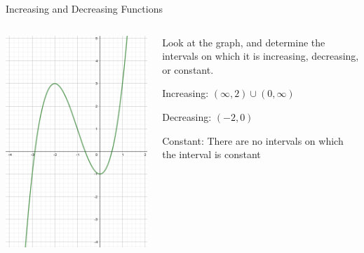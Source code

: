 \documentclass{beamer}
\begin{document}
\begin{frame}[t]{Increasing and Decreasing Functions}
\begin{columns}
\begin{column}{0.5\textwidth}
\includegraphics[width=\textwidth]{Graph1.png}
\end{column}
\begin{column}{0.5\textwidth}
Look at the graph, and determine the intervals on which it is increasing, decreasing, or constant. \vspace{12pt}

\pause Increasing: $(\infty, 2) \cup (0, \infty)$ \vspace{12pt}

\pause Decreasing: $(-2, 0)$ \vspace{12pt}

\pause Constant: There are no intervals on which the interval is constant
\end{column}
\end{columns}
\end{frame}
\end{document}
